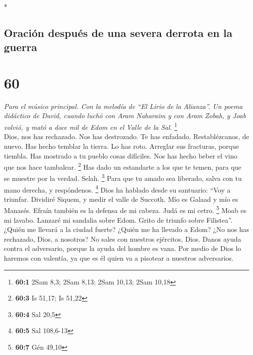 \begin{paracol}{2}
\switchcolumn[0]*

\hypertarget{oraciuxf3n-despuuxe9s-de-una-severa-derrota-en-la-guerra}{%
\subsection{Oración después de una severa derrota en la
guerra}\label{oraciuxf3n-despuuxe9s-de-una-severa-derrota-en-la-guerra}}

\hypertarget{section-118}{%
\section{60}\label{section-118}}

\emph{Para el músico principal. Con la melodía de ``El Lirio de la
Alianza''. Un poema didáctico de David, cuando luchó con Aram Naharaim y
con Aram Zobah, y Joab volvió, y mató a doce mil de Edom en el Valle de
la Sal.} \footnote{\textbf{60:1} 2Sam 8,3; 2Sam 8,13; 2Sam 10,13; 2Sam
  10,18}\\
 Dios, nos has rechazado. Nos has destrozado. Te has
enfadado. Restablézcanos, de nuevo.  Has hecho temblar la
tierra. Lo has roto. Arreglar sus fracturas, porque tiembla.
 Has mostrado a tu pueblo cosas difíciles. Nos has hecho
beber el vino que nos hace tambalear. \footnote{\textbf{60:3} Is 51,17;
  Is 51,22}  Has dado un estandarte a los que te temen,
para que se muestre por la verdad. Selah. \footnote{\textbf{60:4} Sal
  20,5}  Para que tu amado sea liberado, salva con tu mano
derecha, y respóndenos. \footnote{\textbf{60:5} Sal 108,6-13}
 Dios ha hablado desde su santuario: ``Voy a triunfar.
Dividiré Siquem, y medir el valle de Succoth.  Mío es
Galaad y mío es Manasés. Efraín también es la defensa de mi cabeza. Judá
es mi cetro. \footnote{\textbf{60:7} Gén 49,10}  Moab es
mi lavabo. Lanzaré mi sandalia sobre Edom. Grito de triunfo sobre
Filistea''.  ¿Quién me llevará a la ciudad fuerte? ¿Quién
me ha llevado a Edom?  ¿No nos has rechazado, Dios, a
nosotros? No sales con nuestros ejércitos, Dios.  Danos
ayuda contra el adversario, porque la ayuda del hombre es vana.
 Por medio de Dios lo haremos con valentía, ya que es él
quien va a pisotear a nuestros adversarios.

\switchcolumn
\begin{otherlanguage}{english}

\hypertarget{section-119}{%
}
\end{otherlanguage}
\end{paracol}
